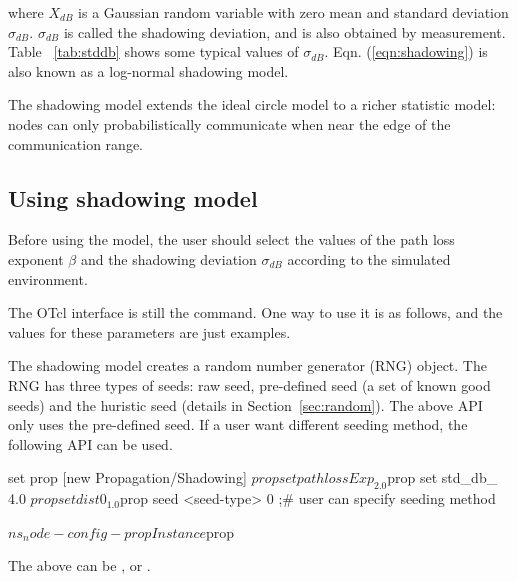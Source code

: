 where $X_{dB}$ is a Gaussian random variable with zero mean and
standard deviation $\sigma_{dB}$. $\sigma_{dB}$ is called the
shadowing deviation, and is also obtained by measurement. Table
~\ref{tab:stddb} shows some typical values of $\sigma_{dB}$. Eqn.
(\ref{eqn:shadowing}) is also known as a log-normal shadowing model.

The shadowing model extends the ideal circle model to a richer
statistic model: nodes can only probabilistically communicate when
near the edge of the communication range.


\subsection{Using shadowing model}

Before using the model, the user should select the values of the path
loss exponent $\beta$ and the shadowing deviation $\sigma_{dB}$
according to the simulated environment.

The OTcl interface is still the  command. One way to
use it is as follows, and the values for these parameters are just examples.


The shadowing model creates a random number generator (RNG) object. The RNG has
three types of seeds: raw seed, pre-defined seed (a set of known good seeds)
and the huristic seed (details in Section~\ref{sec:random}). The
above API only uses the pre-defined seed. If a user want different seeding
method, the following API can be used.

\begin{program}
set prop [new Propagation/Shadowing]
$prop set pathlossExp_ 2.0
$prop set std_db_ 4.0
$prop set dist0_ 1.0
$prop seed <seed-type> 0              ;# user can specify seeding method

$ns_ node-config -propInstance $prop
\end{program}

The  above can be ,  or .

